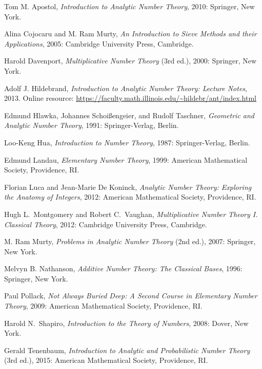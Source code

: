 \renewcommand\refname{\normalsize Suggestions for Further Reading}
\begin{thebibliography}{11}
      Tom M. Apostol, {\em Introduction to Analytic Number Theory}, 2010:
    Springer, New York.

     Alina Cojocaru and M. Ram Murty, \emph{An Introduction to Sieve Methods and their Applications}, 2005: Cambridge University Press, Cambridge.

     Harold Davenport, {\em Multiplicative Number Theory} (3rd ed.), 2000: Springer,
New York.


 Adolf J. Hildebrand, {\em Introduction to Analytic Number Theory: Lecture Notes}, 2013. Online resource: \url{https://faculty.math.illinois.edu/~hildebr/ant/index.html}

 Edmund Hlawka, Johannes Schoi\ss engeier, and Rudolf Taschner, {\em Geometric and Analytic Number Theory}, 1991: Springer-Verlag, Berlin.


 Loo-Keng Hua, {\em Introduction to Number Theory}, 1987: Springer-Verlag, Berlin.

 Edmund Landau, {\em Elementary Number Theory}, 1999: American Mathematical Society, Providence, RI.

 Florian Luca and Jean-Marie De Koninck, {\em Analytic Number Theory: Exploring the Anatomy of Integers}, 2012: American Mathematical Society, Providence, RI.

     Hugh L.\ Montgomery and Robert C.\ Vaughan, {\em Multiplicative Number Theory I. Classical Theory}, 2012: Cambridge University Press, Cambridge.

 M. Ram Murty, {\em Problems in Analytic Number Theory} (2nd ed.), 2007: Springer, New York.

 Melvyn B. Nathanson, {\em Additive Number Theory: The Classical Bases}, 1996: Springer, New York.

     Paul Pollack, {\em Not Always Buried Deep: A Second Course in Elementary Number Theory}, 2009: American Mathematical Society, Providence, RI.

     Harold N.\ Shapiro, {\em Introduction to the Theory of Numbers}, 2008: Dover, New York.

     Gerald Tenenbaum, {\em Introduction to Analytic and Probabilistic Number Theory} (3rd ed.), 2015: American Mathematical Society, Providence, RI.



    \end{thebibliography} 
